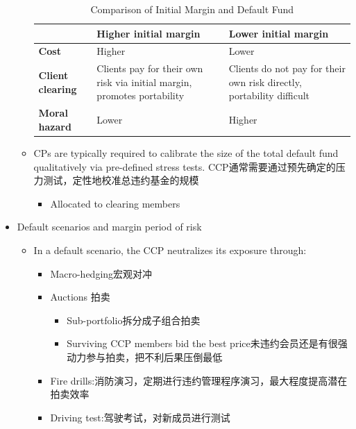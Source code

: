 \begin{itemize}
\begin{itemize}
    \begin{table}[h]
        \centering
        \begin{tabular}{|p{5cm}|p{5cm}|p{5cm}|}
            \hline
            & \textbf{Higher initial margin} & \textbf{Lower initial margin} \\
            \hline
            \textbf{Cost} & Higher & Lower \\
            \hline
            \textbf{Client clearing} & Clients pay for their own risk via initial margin, promotes portability & Clients do not pay for their own risk directly, portability difficult \\
            \hline
            \textbf{Moral hazard} & Lower & Higher \\
            \hline
        \end{tabular}
        \caption{Comparison of Initial Margin and Default Fund}
    \end{table}
\item CPs are typically required to calibrate the size of the total default fund qualitatively via pre-defined stress tests. CCP通常需要通过预先确定的压力测试，定性地校准总违约基金的规模
\begin{itemize}
    \item Allocated to clearing members
\end{itemize}

\end{itemize}



\item Default scenarios and margin period of risk
\begin{itemize}
    \item  In a default scenario, the CCP neutralizes its exposure through:
    \begin{itemize}
        \item Macro-hedging宏观对冲
        \item Auctions 拍卖
        \begin{itemize}
        \item Sub-portfolio拆分成子组合拍卖
        \item Surviving CCP members bid the best price未违约会员还是有很强动力参与拍卖，把不利后果压倒最低
        \end{itemize}
        \item Fire drills:消防演习，定期进行违约管理程序演习，最大程度提高潜在拍卖效率
        \item Driving test:驾驶考试，对新成员进行测试
    \end{itemize}
\end{itemize}


\end{itemize}
